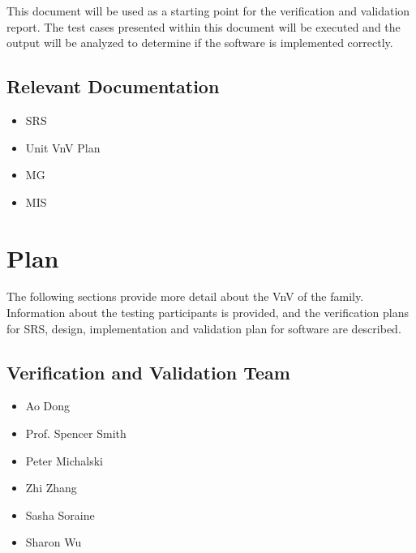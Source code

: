 \documentclass[12pt, titlepage]{article}
\begin{document}
This document will be used as a starting point for the verification and
validation report.  The test cases presented within this document will be
executed and the output will be analyzed to determine if the software is
implemented correctly.

\subsection{Relevant Documentation}

\begin{itemize}
    \item SRS \cite{Dong2019SRS}
    \item Unit VnV Plan \cite{Dong2019UnitVnv}
    \item MG \cite{Dong2019MG}
    \item MIS \cite{Dong2019MIS}
\end{itemize}


\section{Plan} \label{sec_plan}

The following sections provide more detail about the VnV of the
\progname{} family. Information about the testing participants is provided, and
the verification plans for SRS, design, implementation and validation plan for
software are described.

\subsection{Verification and Validation Team}

\begin{itemize}
    \item Ao Dong
    \item Prof. Spencer Smith
    \item Peter Michalski
    \item Zhi Zhang
    \item Sasha Soraine
    \item Sharon Wu
    

\end{itemize}
\end{document}
